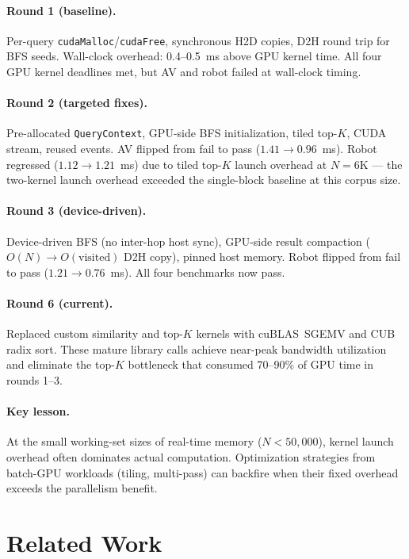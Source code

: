 \documentclass[11pt]{article}
\begin{document}
\paragraph{Round 1 (baseline).} Per-query
\texttt{cudaMalloc}/\texttt{cudaFree}, synchronous H2D copies, D2H
round trip for BFS seeds. Wall-clock overhead: 0.4--0.5~ms above GPU
kernel time. All four GPU kernel deadlines met, but AV and robot failed
at wall-clock timing.

\paragraph{Round 2 (targeted fixes).} Pre-allocated \texttt{QueryContext},
GPU-side BFS initialization, tiled top-$K$, CUDA stream, reused events.
AV flipped from fail to pass ($1.41 \to 0.96$~ms). Robot regressed
($1.12 \to 1.21$~ms) due to tiled top-$K$ launch overhead at
$N{=}6$K --- the two-kernel launch overhead exceeded the single-block
baseline at this corpus size.

\paragraph{Round 3 (device-driven).} Device-driven BFS (no inter-hop host
sync), GPU-side result compaction ($O(N) \to O(\text{visited})$ D2H
copy), pinned host memory. Robot flipped from fail to pass
($1.21 \to 0.76$~ms). All four benchmarks now pass.

\paragraph{Round 6 (current).} Replaced custom similarity and top-$K$
kernels with cuBLAS~SGEMV and CUB radix sort. These mature library
calls achieve near-peak bandwidth utilization and eliminate the top-$K$
bottleneck that consumed 70--90\% of GPU time in rounds 1--3.

\paragraph{Key lesson.} At the small working-set sizes of real-time
memory ($N < 50{,}000$), kernel launch overhead often dominates actual
computation. Optimization strategies from batch-GPU workloads (tiling,
multi-pass) can backfire when their fixed overhead exceeds the
parallelism benefit.

\section{Related Work}
\label{sec:related}
\end{document}
